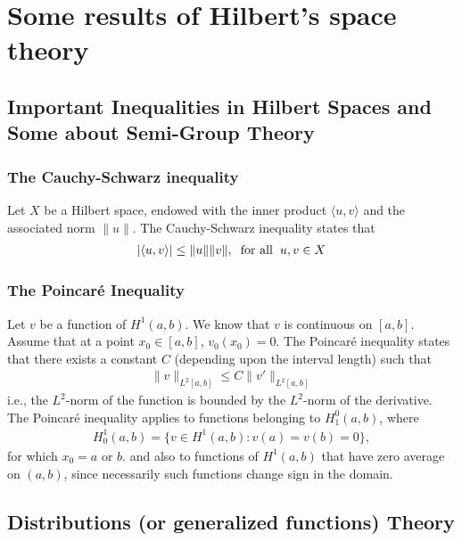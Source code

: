 \chapter{Some results of Hilbert's space theory}
\label{Appendix_A}
	
	\section{Important Inequalities in Hilbert Spaces and Some about Semi-Group Theory}
	\subsection{The Cauchy-Schwarz inequality}
	\label{Cauchy_Schwarz}
		Let $X$ be a Hilbert space, endowed with the inner product $\langle u, v \rangle$ and the associated norm $\| u \|$. The Cauchy-Schwarz inequality states that
		\begin{align*}
			|\langle u, v \rangle| \leq \| u \| \| v \|, \hspace{2mm} \text{for all} \hspace{2mm} u, v \in X
		\end{align*}

	\subsection{The Poincar\'e Inequality}
	\label{Poincare}
		Let $v$ be a function of $H^1 (a, b)$. We know that $v$ is continuous on $[a, b]$. Assume that at a point $x_0 ∈ [a, b]$, $v_0 (x_0) = 0$. The Poincar\'e inequality states that there exists a constant $C$ (depending upon the interval length) such that
		\begin{align*}
			\| v \|_{L^2 [a, b]} \leq C \| v' \|_{L^2 [a, b]}
		\end{align*}
		i.e., the $L^2$-norm of the function is bounded by the $L^2$-norm of the derivative. The Poincar\'e inequality applies to functions belonging to $H^0_1 (a, b)$, where
		\begin{align*}
			H^1_0 (a, b) = \{ v \in H^1 (a, b) : v(a) = v(b) = 0 \} ,
		\end{align*}
		for which $x_0 = a$ or $b$. and also to functions of $H^1 (a, b)$ that have zero average on $(a, b)$, since necessarily such functions change sign in the domain.		

	\section{Distributions (or generalized functions) Theory}
	

